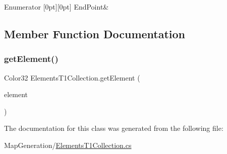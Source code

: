 \begin{DoxyEnumFields}{Enumerator}
[0pt][0pt]{}\mbox{\label{class_elements_t1_collection_aec399e621c99ecb08e2e39fa299057e9ab7ae24ea48e61624a7e4078daa60bd78}} 
End\+Point&\\
\hline

\end{DoxyEnumFields}


\subsection{Member Function Documentation}
\mbox{\label{class_elements_t1_collection_a0ed14a425093b4638af05104311d951d}} 
\subsubsection{\texorpdfstring{get\+Element()}{getElement()}}
{\footnotesize\ttfamily Color32 Elements\+T1\+Collection.\+get\+Element (\begin{DoxyParamCaption}\item[{\mbox{\hyperlink{class_elements_t1_collection_aec399e621c99ecb08e2e39fa299057e9}{Elements\+T1}}}]{element }\end{DoxyParamCaption})}



The documentation for this class was generated from the following file\+:\begin{DoxyCompactItemize}
\item 
Map\+Generation/\mbox{\hyperlink{_elements_t1_collection_8cs}{Elements\+T1\+Collection.\+cs}}\end{DoxyCompactItemize}
